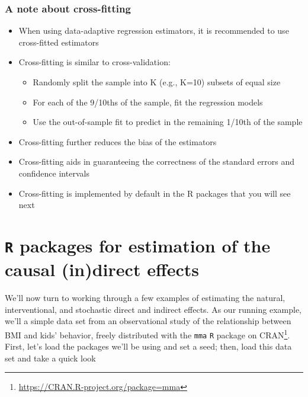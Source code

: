\documentclass[
  12pt,
]{book}
\newcommand{\passthrough}[1]{#1}
\providecommand{\tightlist}{%
  \setlength{\itemsep}{0pt}\setlength{\parskip}{0pt}}
\renewcommand{\href}[2]{#2\footnote{\url{#1}}}
\theoremstyle{definition}
\theoremstyle{definition}
\theoremstyle{definition}
\newcommand{\1}{\mathbbm{1}}
\begin{document}
\hypertarget{a-note-about-cross-fitting}{%
\subsection{A note about cross-fitting}\label{a-note-about-cross-fitting}}

\begin{itemize}
\tightlist
\item
  When using data-adaptive regression estimators, it is recommended to use cross-fitted estimators
\item
  Cross-fitting is similar to cross-validation:

  \begin{itemize}
  \tightlist
  \item
    Randomly split the sample into K (e.g., K=10) subsets of equal size
  \item
    For each of the 9/10ths of the sample, fit the regression models
  \item
    Use the out-of-sample fit to predict in the remaining 1/10th of the sample
  \end{itemize}
\item
  Cross-fitting further reduces the bias of the estimators
\item
  Cross-fitting aids in guaranteeing the correctness of the standard errors and confidence intervals
\item
  Cross-fitting is implemented by default in the R packages that you will see next
\end{itemize}

\hypertarget{r-packages-for-estimation-of-the-causal-indirect-effects}{%
\chapter{\texorpdfstring{\texttt{R} packages for estimation of the causal (in)direct effects}{R packages for estimation of the causal (in)direct effects}}\label{r-packages-for-estimation-of-the-causal-indirect-effects}}

We'll now turn to working through a few examples of estimating the natural,
interventional, and stochastic direct and indirect effects. As our running
example, we'll a simple data set from an observational study of the relationship
between BMI and kids' behavior, freely distributed with the \href{https://CRAN.R-project.org/package=mma}{\passthrough{\lstinline!mma!} \passthrough{\lstinline!R!} package
on CRAN}. First, let's load the packages
we'll be using and set a seed; then, load this data set and take a quick look
\end{document}
